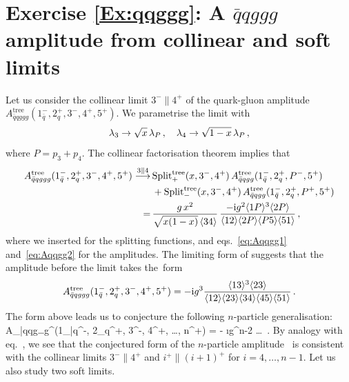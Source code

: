 \newpage

\section*{Exercise \ref{Ex:qqggg}: A $\bar{q}qggg$ amplitude from collinear and soft limits}
\label{Sol:qqggg}
%
Let us consider the collinear limit $3^{-} \parallel 4^{+}$ of the quark-gluon amplitude \break
$A_{\bar{q}qggg}^{\text{tree}}(1_{\bar q}^{-}, 2_{q}^{+}, 3^{-}, 4^{+}, 5^{+})$. We parametrise the limit with
$$
\lambda_{3}\to \sqrt{x}\, \lambda_{P}\, , \quad  \lambda_{4}\to\sqrt{1-x}\, \lambda_{P} \,,
$$
where $P=p_3+p_4$. The collinear factorisation theorem implies that
\begin{align} \label{5qqlimit}
\begin{aligned}
A_{\bar{q}qggg}^{\text{tree}}(1_{\bar q}^{-}, 2_{q}^{+}, 3^{-}, 4^{+}, 5^{+})  
\stackrel{3 \parallel 4}{\longrightarrow} \, &
\text{Split}^{\text{tree}}_{+}(x,3^{-},4^{+})\, A_{\bar{q}qgg}^{\text{tree}}
(1_{\bar q}^{-}, 2_{q}^{+}, P^{-}, 5^{+}) \\ & +  
\text{Split}^{\text{tree}}_{-}(x,3^{-},4^{+})\, 
A_{\bar{q}qgg}^{\text{tree}}(1_{\bar q}^{-}, 2_{q}^{+}, P^{+}, 5^{+}) \\
= \, & \frac{g \, x^{2}}{\sqrt{x (1-x)}\, \langle34\rangle}\, \frac{- \mathrm{i} g^2 \langle1P\rangle^{3}\langle2P\rangle}{\langle12\rangle\langle2P\rangle\langle P5\rangle
\langle51\rangle} \,,
\end{aligned}
\end{align}
where we inserted  for the splitting functions, and eqs.~\eqref{eq:Aqqgg1} and~\eqref{eq:Aqqgg2} for the amplitudes.
The limiting form of  suggests that the amplitude before the limit takes the~form
\begin{align}
A_{\bar{q}qggg}^{\text{tree}}(1_{\bar q}^{-}, 2_{q}^{+}, 3^{-}, 4^{+}, 5^{+}) = - \mathrm{i} g^3 \frac{\langle13\rangle^{3}\langle23\rangle}
{\langle12\rangle\langle23\rangle\langle34\rangle\langle45\rangle\langle51\rangle} \, .
\end{align}
The form above leads us to conjecture the following $n$-particle generalisation:
\be
A_{\bar{q}qg\ldots g}^{}(1_{\bar q}^{-}, 2_{q}^{+}, 3^{-}, 4^{+}, \ldots, n^{+}) = - \i g^{n-2} 
{\ldots{}}\, .
\label{qqnpoint}
\ee
By analogy with eq.~, we see that the conjectured form of the $n$-particle amplitude~ 
is consistent with the collinear limits $3^{-} \parallel 4^{+}$ and $i^{+} \parallel (i+1)^{+}$ for $i=4,\ldots , n-1$. 
Let us also study two soft limits.

